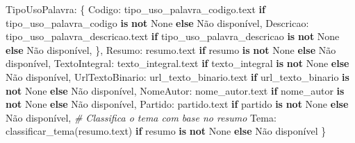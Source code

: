 \documentclass[
]{article}
\newenvironment{Shaded}{\begin{snugshade}}{\end{snugshade}}
\newcommand{\CommentTok}[1]{\textcolor[rgb]{0.56,0.35,0.01}{\textit{#1}}}
\newcommand{\ControlFlowTok}[1]{\textcolor[rgb]{0.13,0.29,0.53}{\textbf{#1}}}
\newcommand{\KeywordTok}[1]{\textcolor[rgb]{0.13,0.29,0.53}{\textbf{#1}}}
\newcommand{\NormalTok}[1]{#1}
\newcommand{\StringTok}[1]{\textcolor[rgb]{0.31,0.60,0.02}{#1}}
\newcommand{\VariableTok}[1]{\textcolor[rgb]{0.00,0.00,0.00}{#1}}
\begin{document}
\begin{Shaded}
\begin{Highlighting}[]
                    \StringTok{\textquotesingle{}TipoUsoPalavra\textquotesingle{}}\NormalTok{: \{}
                        \StringTok{\textquotesingle{}Codigo\textquotesingle{}}\NormalTok{: tipo\_uso\_palavra\_codigo.text }\ControlFlowTok{if}\NormalTok{ tipo\_uso\_palavra\_codigo }\KeywordTok{is} \KeywordTok{not} \VariableTok{None} \ControlFlowTok{else} \StringTok{\textquotesingle{}Não disponível\textquotesingle{}}\NormalTok{,}
                        \StringTok{\textquotesingle{}Descricao\textquotesingle{}}\NormalTok{: tipo\_uso\_palavra\_descricao.text }\ControlFlowTok{if}\NormalTok{ tipo\_uso\_palavra\_descricao }\KeywordTok{is} \KeywordTok{not} \VariableTok{None} \ControlFlowTok{else} \StringTok{\textquotesingle{}Não disponível\textquotesingle{}}\NormalTok{,}
\NormalTok{                    \},}
                    \StringTok{\textquotesingle{}Resumo\textquotesingle{}}\NormalTok{: resumo.text }\ControlFlowTok{if}\NormalTok{ resumo }\KeywordTok{is} \KeywordTok{not} \VariableTok{None} \ControlFlowTok{else} \StringTok{\textquotesingle{}Não disponível\textquotesingle{}}\NormalTok{,}
                    \StringTok{\textquotesingle{}TextoIntegral\textquotesingle{}}\NormalTok{: texto\_integral.text }\ControlFlowTok{if}\NormalTok{ texto\_integral }\KeywordTok{is} \KeywordTok{not} \VariableTok{None} \ControlFlowTok{else} \StringTok{\textquotesingle{}Não disponível\textquotesingle{}}\NormalTok{,}
                    \StringTok{\textquotesingle{}UrlTextoBinario\textquotesingle{}}\NormalTok{: url\_texto\_binario.text }\ControlFlowTok{if}\NormalTok{ url\_texto\_binario }\KeywordTok{is} \KeywordTok{not} \VariableTok{None} \ControlFlowTok{else} \StringTok{\textquotesingle{}Não disponível\textquotesingle{}}\NormalTok{,}
                    \StringTok{\textquotesingle{}NomeAutor\textquotesingle{}}\NormalTok{: nome\_autor.text }\ControlFlowTok{if}\NormalTok{ nome\_autor }\KeywordTok{is} \KeywordTok{not} \VariableTok{None} \ControlFlowTok{else} \StringTok{\textquotesingle{}Não disponível\textquotesingle{}}\NormalTok{,}
                    \StringTok{\textquotesingle{}Partido\textquotesingle{}}\NormalTok{: partido.text }\ControlFlowTok{if}\NormalTok{ partido }\KeywordTok{is} \KeywordTok{not} \VariableTok{None} \ControlFlowTok{else} \StringTok{\textquotesingle{}Não disponível\textquotesingle{}}\NormalTok{,}
                    \CommentTok{\# Classifica o tema com base no resumo}
                    \StringTok{\textquotesingle{}Tema\textquotesingle{}}\NormalTok{: classificar\_tema(resumo.text) }\ControlFlowTok{if}\NormalTok{ resumo }\KeywordTok{is} \KeywordTok{not} \VariableTok{None} \ControlFlowTok{else} \StringTok{\textquotesingle{}Não disponível\textquotesingle{}}
\NormalTok{                \}}


\end{Highlighting}
\end{Shaded}
\end{document}
